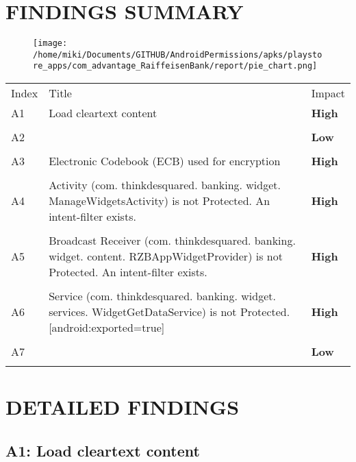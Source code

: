 \documentclass[12p]{article}
\begin{document}
\section{FINDINGS SUMMARY}\label{sec:summary}
\begin{figure}[H]
\centering
	\texttt{[image: /home/miki/Documents/GITHUB/AndroidPermissions/apks/playstore\_apps/com\_advantage\_RaiffeisenBank/report/pie\_chart.png]}
\end{figure}
	\begin{longtable}{p{0.5cm} p{10cm} p{1.5cm}}
	\rowcolor{grannysmithapple!70} Index & Title & Impact \\
	A1&Load cleartext content& \color{ferrarired}\textbf{High} \\
\hline\\	A2&& \color{amber}\textbf{Low} \\
\hline\\	A3&Electronic Codebook \newline (ECB) used for encryption& \color{ferrarired}\textbf{High} \\
\hline\\	A4&Activity \newline (com. thinkdesquared. banking. widget. ManageWidgetsActivity) is not Protected. An intent-filter exists.& \color{ferrarired}\textbf{High} \\
\hline\\	A5&Broadcast Receiver \newline (com. thinkdesquared. banking. widget. content. RZBAppWidgetProvider) is not Protected. An intent-filter exists.& \color{ferrarired}\textbf{High} \\
\hline\\	A6&Service \newline (com. thinkdesquared. banking. widget. services. WidgetGetDataService) is not Protected. [android:exported=true]& \color{ferrarired}\textbf{High} \\
\hline\\	A7&& \color{amber}\textbf{Low} \\
\hline\\	\end{longtable}
\cleardoublepage
\newpage
\section{DETAILED FINDINGS}
\subsection{A1: Load cleartext content}
\end{document}
